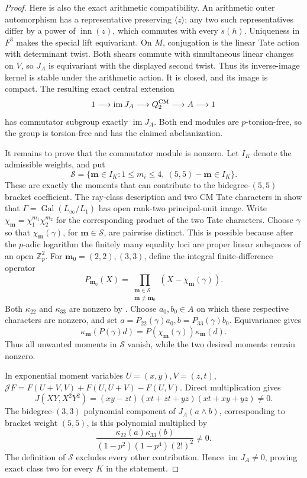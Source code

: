 \documentclass[11pt]{article}
\theoremstyle{definition}\newtheorem{definition}[theorem]{Definition}
\begin{document}
\begin{proof}
Here is also the exact arithmetic compatibility.
An arithmetic outer automorphism has a representative
preserving \(\langle z\rangle\); any two such
representatives differ by a power of
\(\operatorname{inn}(z)\), which commutes with every
\(s(h)\).  Uniqueness in \(F^3\) makes the special lift
equivariant.  On \(M\), conjugation is the linear
Tate action with determinant twist.  Both shears
commute with simultaneous linear changes on \(V\),
so \(J_A\) is equivariant with the displayed second
twist.  Thus its inverse-image kernel is stable
under the arithmetic action.  It is closed, and its
image is compact.  The resulting exact central extension
\[
 1\longrightarrow\operatorname{im}J_A
 \longrightarrow Q_2^{\rm CM}\longrightarrow A
 \longrightarrow1
\]
has commutator subgroup exactly \(\operatorname{im}J_A\).
Both end modules are \(p\)-torsion-free, so the group
is torsion-free and has the claimed abelianization.

It remains to prove that the commutator module is nonzero.
Let \(I_K\) denote the admissible weights, and put
\[
 \mathcal S=\{\boldsymbol m\in I_K:
  1\leq m_i\leq4,\ (5,5)-\boldsymbol m\in I_K\}.
\]
These are exactly the moments that can contribute
to the bidegree-\((5,5)\) bracket coefficient.
The ray-class description and two CM Tate characters
in \cite[pp.~4--5]{Ishii} show that
\(\Gamma=\operatorname{Gal}(L_\infty/L_1)\) has open
rank-two principal-unit image. Write
\(\chi_{\boldsymbol m}=\chi_1^{m_1}\chi_2^{m_2}\)
for the corresponding product of the two Tate characters. Choose \(\gamma\)
so that \(\chi_{\boldsymbol m}(\gamma)\), for
\(\boldsymbol m\in\mathcal S\), are pairwise distinct.
This is possible because after the \(p\)-adic logarithm
the finitely many equality loci are proper linear
subspaces of an open \(\mathbb Z_p^2\).
For \(\boldsymbol m_0=(2,2),(3,3)\), define the integral
finite-difference operator
\[
 P_{\boldsymbol m_0}(X)=
 \prod_{\substack{\boldsymbol m\in\mathcal S\\
                   \boldsymbol m\ne\boldsymbol m_0}}
       (X-\chi_{\boldsymbol m}(\gamma)).
\]
Both \(\kappa_{22}\) and \(\kappa_{33}\) are nonzero
by \cite[Theorem 2.8(2) and the following Soul\'e-finiteness
paragraph, p.~9]{Ishii}.
Choose \(a_0,b_0\in A\) on which these respective
characters are nonzero, and set
\(a=P_{22}(\gamma)a_0,b=P_{33}(\gamma)b_0\).
Equivariance gives
\[
 \kappa_{\boldsymbol m}(P(\gamma)d)
   =P(\chi_{\boldsymbol m}(\gamma))\kappa_{\boldsymbol m}(d).
\]
Thus all unwanted moments in \(\mathcal S\) vanish,
while the two desired moments remain nonzero.

In exponential moment variables \(U=(x,y),V=(z,t)\),
\(\mathcal JF=F(U+V,V)+F(U,U+V)-F(U,V)\).
Direct multiplication gives
\[
 J(XY,X^2Y^2)
       =(xy-zt)(xt+zt+yz)(xt+xy+yz)\ne0.
\]
The bidegree-\((3,3)\) polynomial component of
\(J_A(a\wedge b)\), corresponding to bracket weight
\((5,5)\), is this polynomial multiplied by
\[
 \frac{\kappa_{22}(a)\kappa_{33}(b)}
      {(1-p^2)(1-p^4)(2!)^2}\ne0.
\]
The definition of \(\mathcal S\) excludes every other
contribution.  Hence \(\operatorname{im}J_A\ne0\),
proving exact class two for every \(K\) in the statement.
\end{proof}
\end{document}
